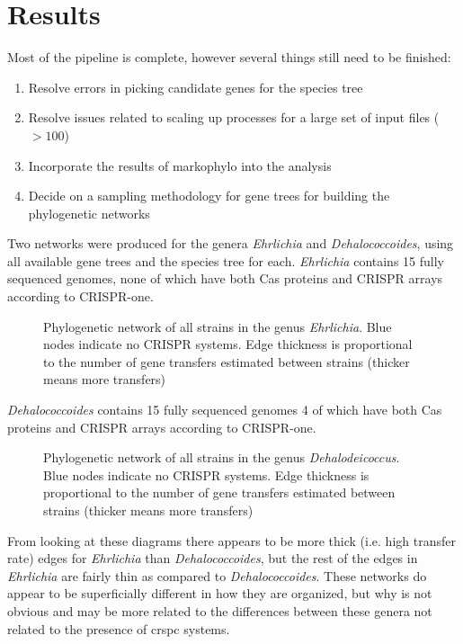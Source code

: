 \section*{\huge Results}
Most of the pipeline is complete, however several things still need to be finished:
\begin{enumerate}
    \item Resolve errors in picking candidate genes for the species tree
    \item Resolve issues related to scaling up processes for a large set of input files ($> 100$)
    \item Incorporate the results of markophylo into the analysis
    \item Decide on a sampling methodology for gene trees for building the phylogenetic networks
\end{enumerate}
Two networks were produced for the genera \textit{Ehrlichia} and \textit{Dehalococcoides}, using all available gene trees and the species tree for each.
\textit{Ehrlichia} contains 15 fully sequenced genomes, none of which have both Cas proteins and CRISPR arrays according to CRISPR-one.
\begin{figure}[htb!]
    \caption{Phylogenetic network of all strains in the genus \textit{Ehrlichia}. Blue nodes indicate no CRISPR systems. Edge thickness is proportional to the number of gene transfers estimated between strains (thicker means more transfers)}
\end{figure}
\FloatBarrier
\textit{Dehalococcoides} contains 15 fully sequenced genomes 4 of which have both Cas proteins and CRISPR arrays according to CRISPR-one.
\begin{figure}[htb!]
    \caption{Phylogenetic network of all strains in the genus \textit{Dehalodeicoccus}. Blue nodes indicate no CRISPR systems. Edge thickness is proportional to the number of gene transfers estimated between strains (thicker means more transfers)}
\end{figure}
\FloatBarrier
From looking at these diagrams there appears to be more thick (i.e. high transfer rate) edges for \textit{Ehrlichia} than \textit{Dehalococcoides}, but the rest of the edges in \textit{Ehrlichia} are fairly thin as compared to \textit{Dehalococcoides}.
These networks do appear to be superficially different in how they are organized, but why is not obvious and may be more related to the differences between these genera not related to the presence of \ac{crspc} systems.
